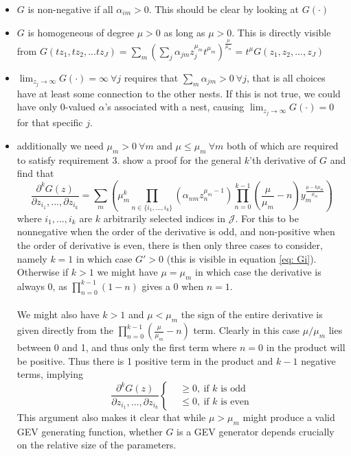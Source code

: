 \begin{itemize}
  \item $G$ is non-negative if all $\alpha_{im} > 0$. This should be clear by looking at $G(\cdot)$
  \item $G$ is homogeneous of degree $\mu>0$ as long as $\mu>0$. This is directly visible from $G(tz_1, tz_2, ... tz_J) = \sum_m \left(\sum_j \alpha_{jm}z_j^{\mu_m} t^{\mu_m} \right)^{\frac{\mu}{\mu_m}} = t^{\mu} G(z_1, z_2, ..., z_J)$
  \item $\lim_{z_j \rightarrow \infty} G( \cdot)= \infty \ \forall j$ requires that $\sum_m \alpha_{jm} > 0  \ \forall j$, that is all choices have at least some connection to the other nests. If this is not true, we could have only $0$-valued $\alpha$'s associated with a nest, causing $\lim_{z_j \rightarrow \infty} G( \cdot) = 0$ for that specific $j$.
  \item additionally we need $\mu_m> 0 \ \forall m$ and $\mu \leq \mu_m \ \forall m$ both of which are required to satisfy requirement 3. \citet{bierlaire_theoretical_2006} show a proof for the general $k$'th derivative of $G$ and find that
  \begin{equation}
    \frac{\partial^k G(z)}{\partial z_{i_1}, ..., \partial z_{i_k}} = \sum_m \left(
     \mu_m^k \prod_{n\in\{i_1, ..., i_k\}} (\alpha_{nm}z_n^{\mu_m -1}) \prod_{n=0}^{k-1}\left( \frac{ \mu}{\mu_m} - n \right) y_m^{\frac{\mu - k \mu_m}{\mu_m}}
    \right)
  \end{equation}
  where $i_1, ..., i_k$ are $k$ arbitrarily selected indices in $\mathcal{J}$. For this to be nonnegative when the order of the derivative is odd, and non-positive when the order of derivative is even, there is then only three cases to consider, namely $k=1$ in which case $G'>0$ (this is visible in equation \eqref{eq: Gi}). Otherwise if $k>1$ we might have $\mu=\mu_m$ in which case the derivative is always $0$, as $\prod_{n=0}^{k-1} (1 - n)$ gives a $0$ when $n=1$.
  \\ \\
  We might also have $k>1$ and $\mu< \mu_m$ the sign of the entire derivative is given directly from the $\prod_{n=0}^{k-1} (\frac{\mu}{\mu_m} - n)$ term. Clearly in this case $\mu / \mu_m$ lies between $0$ and 1, and thus only the first term where $n=0$ in the product will be positive. Thus there is 1 positive term in the product and $k-1$ negative terms, implying
  \begin{equation}
    \frac{\partial^k G(z)}{\partial z_{i_1}, ..., \partial z_{i_k}} \begin{cases}
    &\geq 0, \ \textrm{if }k \textrm{ is odd} \\
    &\leq 0, \ \textrm{if }k \textrm{ is even}
  \end{cases}
  \end{equation}
  This argument also makes it clear that while $\mu>\mu_m$ might produce a valid GEV generating function, whether $G$ is a GEV generator depends crucially on the relative size of the parameters.
\end{itemize}



